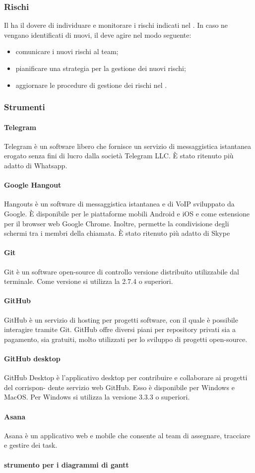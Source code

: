  \subsubsection{Rischi}
 Il \RESP{} ha il dovere di individuare e monitorare i rischi indicati nel \PPdoc. In caso ne vengano identificati di nuovi, il \RESP{} deve agire nel modo seguente:
 \begin{itemize}
  \item comunicare i nuovi rischi al team;
  \item pianificare una strategia per la gestione dei nuovi rischi;
  \item aggiornare le procedure di gestione dei rischi nel \PPdoc.
 \end{itemize}
\subsubsection{Strumenti}
 \paragraph{Telegram}
 Telegram è un software libero che fornisce un servizio di messaggistica istantanea erogato senza fini di lucro dalla società Telegram LLC. È stato ritenuto più adatto di Whatsapp.
 \paragraph{Google Hangout}
 Hangouts è un software di messaggistica istantanea e di VoIP   sviluppato da Google. È disponibile per le piattaforme mobili Android e iOS e come estensione per il browser web Google Chrome. Inoltre, permette la condivisione degli schermi tra i membri della chiamata. È stato ritenuto più adatto di Skype
 \paragraph{Git}
 Git è un software open-source di controllo versione distribuito utilizzabile dal terminale. Come versione si utilizza la 2.7.4 o superiori.
 \paragraph{GitHub}
 GitHub è un servizio di hosting per progetti software, con il quale è possibile interagire tramite Git. GitHub
offre diversi piani per repository privati sia a pagamento, sia gratuiti, molto utilizzati per lo
sviluppo di progetti open-source. 
 \paragraph{GitHub desktop}
 GitHub Desktop è l’applicativo desktop per contribuire e collaborare ai progetti del corrispon-
dente servizio web GitHub. Esso è disponibile per Windows e MacOS. Per Windows si utilizza la versione 3.3.3 o superiori.
 \paragraph{Asana}
 Asana è un applicativo web e mobile che consente al team di assegnare, tracciare e gestire dei task.
 \paragraph{strumento per i diagrammi di gantt}
 
 